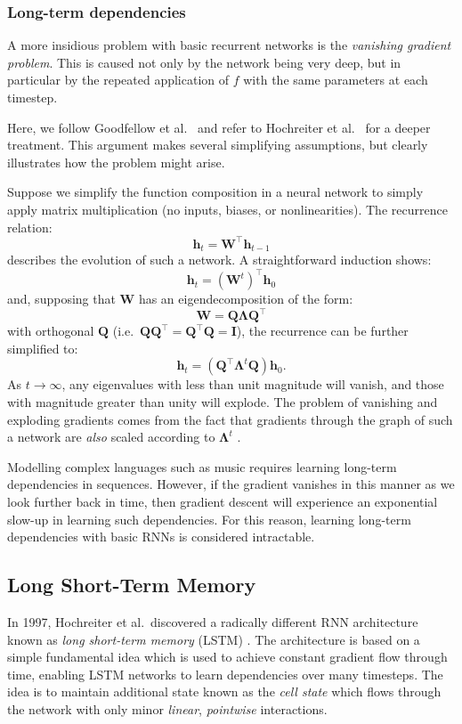 \documentclass[12pt,a4paper,twoside,openright]{report}
\newcommand{\vect}[1]{\boldsymbol{\mathbf{#1}}}
\begin{document}
\subsubsection{Long-term dependencies}

A more insidious problem with basic recurrent networks is the \emph{vanishing
gradient problem}. This is caused not only by the network being very deep, but
in particular by the repeated application of $f$ with the same parameters at
each timestep.

Here, we follow Goodfellow et al.\ \cite{Goodfellow-et-al-2016} and refer to
Hochreiter et al.\ \cite{hochreiter1997long} for a deeper treatment.
This argument makes several simplifying assumptions, but clearly illustrates how
the problem might arise.

Suppose we simplify the function composition in a neural network to simply apply
matrix multiplication (no inputs, biases, or nonlinearities). The
recurrence relation: 
$$ \vect{h}_t = \vect{W}^\top \vect{h}_{t-1} $$ 
describes the evolution of such a network. A straightforward induction shows:
$$ \vect{h}_t = (\vect{W}^t)^\top\vect{h}_0 $$
and, supposing that $\vect{W}$ has an eigendecomposition of the form:
$$ \vect{W} = \vect{Q}\vect{\Lambda}\vect{Q}^\top $$
with orthogonal $\vect{Q}$ (i.e.\ $\vect{Q}\vect{Q}^\top = \vect{Q}^\top\vect{Q}
= \vect{I}$), the recurrence can be further simplified to:
$$ \vect{h}_t = (\vect{Q}^\top \vect{\Lambda}^t \vect{Q}) \vect{h}_0. $$
As $t \rightarrow \infty$, any eigenvalues with less than unit magnitude will
vanish, and those with magnitude greater than unity will explode. The problem of
vanishing and exploding gradients comes from the fact that gradients through the
graph of such a network are \emph{also} scaled according to $\vect{\Lambda}^t$
\cite{Goodfellow-et-al-2016}.

Modelling complex languages such as music requires learning long-term
dependencies in sequences. However, if the gradient vanishes in this manner as
we look further back in time, then gradient descent will experience an
exponential slow-up in learning such dependencies. For this reason, learning
long-term dependencies with basic RNNs is considered intractable.

\subsection{Long Short-Term Memory}\label{sec:lstm-prep}

In 1997, Hochreiter et al.\ discovered a radically different RNN architecture
known as \emph{long short-term memory} (LSTM) \cite{hochreiter1997long}. The
architecture is based on a simple fundamental idea which is used to achieve
constant gradient flow through time, enabling LSTM networks to learn
dependencies over many timesteps. The idea is to maintain additional state known
as the \emph{cell state} which flows through the network with only minor
\emph{linear}, \emph{pointwise} interactions.
\end{document}
